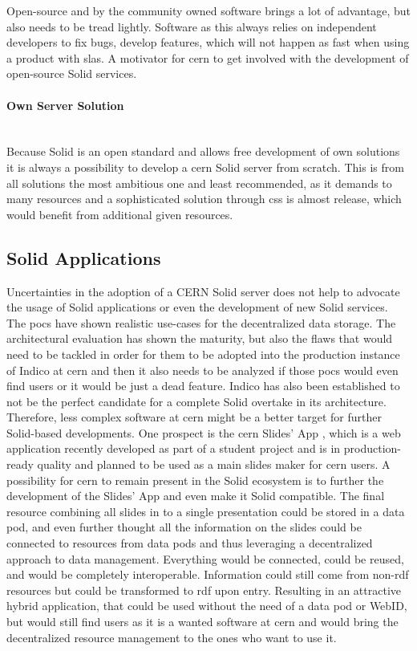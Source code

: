 Open-source and by the community owned software brings a lot of advantage, but also needs to be tread lightly. Software as this always relies on independent developers to fix bugs, develop features, which will not happen as fast when using a product with \glspl{sla}. A motivator for \gls{cern} to get involved with the development of open-source Solid services.
\vspace{0.5cm}
\paragraph{Own Server Solution}\mbox{}\\

Because Solid is an open standard and allows free development of own solutions it is always a possibility to develop a \gls{cern} Solid server from scratch. This is from all solutions the most ambitious one and least recommended, as it demands to many resources and a sophisticated solution through \gls{css} is almost release, which would benefit from additional given resources.

\subsection{Solid Applications}

Uncertainties in the adoption of a CERN Solid server does not help to advocate the usage of Solid applications or even the development of new Solid services. The \glspl{poc} have shown realistic use-cases for the decentralized data storage. The architectural evaluation has shown the maturity, but also the flaws that would need to be tackled in order for them to be adopted into the production instance of Indico at \gls{cern} and then it also needs to be analyzed if those \glspl{poc} would even find users or it would be just a dead feature. Indico has also been established to not be the perfect candidate for a complete Solid overtake in its architecture. Therefore, less complex software at \gls{cern} might be a better target for further Solid-based developments. One prospect is the \gls{cern} Slides' App \cite{cern-slides}, which is a web application recently developed as part of a student project and is in production-ready quality and planned to be used as a main slides maker for \gls{cern} users. A possibility for \gls{cern} to remain present in the Solid ecosystem is to further the development of the Slides' App and even make it Solid compatible. The final resource combining all slides in to a single presentation could be stored in a data pod, and even further thought all the information on the slides could be connected to resources from data pods and thus leveraging a decentralized approach to data management. Everything would be connected, could be reused, and would be completely interoperable. Information could still come from non-\gls{rdf} resources but could be transformed to \gls{rdf} upon entry. Resulting in an attractive hybrid application, that could be used without the need of a data pod or WebID, but would still find users as it is a wanted software at \gls{cern} and would bring the decentralized resource management to the ones who want to use it.

